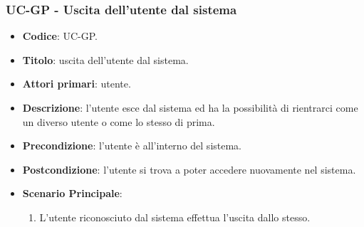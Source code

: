 \subsubsection{UC\theuccount-GP - Uscita dell'utente dal sistema}
	\begin{itemize}
		\item \textbf{Codice}: UC\theuccount-GP.
		\item \textbf{Titolo}: uscita dell'utente dal sistema.
		\item \textbf{Attori primari}: utente.
		\item \textbf{Descrizione}: l'utente esce dal sistema ed ha la possibilità di rientrarci come	un diverso utente o come lo stesso di prima.
		\item \textbf{Precondizione}: l'utente è all'interno del sistema.
		\item \textbf{Postcondizione}: l'utente si trova a poter accedere nuovamente nel sistema.
		\item \textbf{Scenario Principale}:
		\begin{enumerate}
			\item L'utente riconosciuto dal sistema effettua l'uscita dallo stesso.
		\end{enumerate}
	\end{itemize}